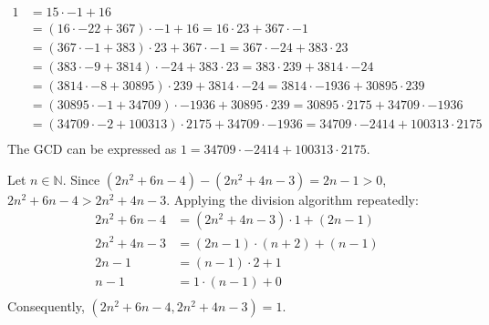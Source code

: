 \documentclass{article}
\begin{document}
\begin{align*}
    1 & = 15 \cdot -1 + 16 \\
    & = (16 \cdot -22 + 367) \cdot -1 + 16 = 16 \cdot 23 + 367 \cdot -1 \\
    & = (367 \cdot -1 + 383) \cdot 23 + 367 \cdot -1 = 367 \cdot -24 + 383 \cdot 23 \\
    & = (383 \cdot -9 + 3814) \cdot -24 + 383 \cdot 23 = 383 \cdot 239 + 3814 \cdot -24 \\
    & = (3814 \cdot -8 + 30895) \cdot 239 + 3814 \cdot -24 = 3814 \cdot -1936 + 30895 \cdot 239 \\
    & = (30895 \cdot -1 + 34709) \cdot -1936 + 30895 \cdot 239 = 30895 \cdot 2175 + 34709 \cdot -1936 \\
    & = (34709 \cdot -2 + 100313) \cdot 2175 + 34709 \cdot -1936 = 34709 \cdot -2414 + 100313 \cdot 2175 \\
\end{align*}
The GCD can be expressed as $1 = 34709 \cdot -2414 + 100313 \cdot 2175$.

\clearpage

\problem{}
Let $n \in \mathbb{N}$. Since $(2n^2 + 6n - 4) - (2n^2 + 4n - 3) = 2n - 1 > 0$, $2n^2 + 6n - 4 > 2n^2 + 4n - 3$. Applying the division algorithm repeatedly:
\begin{align*}
    2n^2 + 6n - 4 & = (2n^2 + 4n - 3) \cdot 1 + (2n - 1) \\
    2n^2 + 4n - 3 & = (2n - 1) \cdot (n + 2) + (n - 1) \\
    2n - 1 & = (n - 1) \cdot 2 + 1 \\
    n - 1 & = 1 \cdot (n - 1) + 0 \\
\end{align*}
Consequently, $(2n^2 + 6n - 4, 2n^2 + 4n - 3) = 1$.
\end{document}
